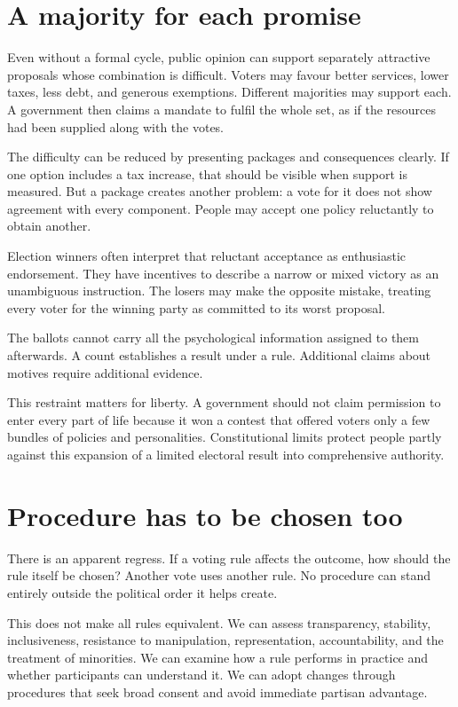 \documentclass[12pt,a4paper]{book}
\begin{document}
\section*{A majority for each promise}

Even without a formal cycle, public opinion can support separately attractive proposals whose combination is difficult. Voters may favour better services, lower taxes, less debt, and generous exemptions. Different majorities may support each. A government then claims a mandate to fulfil the whole set, as if the resources had been supplied along with the votes.

The difficulty can be reduced by presenting packages and consequences clearly. If one option includes a tax increase, that should be visible when support is measured. But a package creates another problem: a vote for it does not show agreement with every component. People may accept one policy reluctantly to obtain another.

Election winners often interpret that reluctant acceptance as enthusiastic endorsement. They have incentives to describe a narrow or mixed victory as an unambiguous instruction. The losers may make the opposite mistake, treating every voter for the winning party as committed to its worst proposal.

The ballots cannot carry all the psychological information assigned to them afterwards. A count establishes a result under a rule. Additional claims about motives require additional evidence.

This restraint matters for liberty. A government should not claim permission to enter every part of life because it won a contest that offered voters only a few bundles of policies and personalities. Constitutional limits protect people partly against this expansion of a limited electoral result into comprehensive authority.

\section*{Procedure has to be chosen too}

There is an apparent regress. If a voting rule affects the outcome, how should the rule itself be chosen? Another vote uses another rule. No procedure can stand entirely outside the political order it helps create.

This does not make all rules equivalent. We can assess transparency, stability, inclusiveness, resistance to manipulation, representation, accountability, and the treatment of minorities. We can examine how a rule performs in practice and whether participants can understand it. We can adopt changes through procedures that seek broad consent and avoid immediate partisan advantage.
\end{document}
